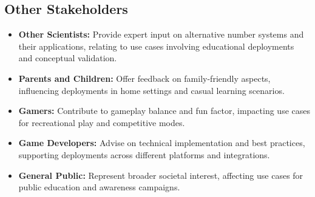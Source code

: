 \documentclass[12pt]{article}
\begin{document}
\subsection{Other Stakeholders}
\begin{itemize}
  \item \textbf{Other Scientists:} Provide expert input on alternative number systems and their applications, relating to use cases involving educational deployments and conceptual validation.
  \item \textbf{Parents and Children:} Offer feedback on family-friendly aspects, influencing deployments in home settings and casual learning scenarios.
  \item \textbf{Gamers:} Contribute to gameplay balance and fun factor, impacting use cases for recreational play and competitive modes.
  \item \textbf{Game Developers:} Advise on technical implementation and best practices, supporting deployments across different platforms and integrations.
  \item \textbf{General Public:} Represent broader societal interest, affecting use cases for public education and awareness campaigns.
\end{itemize}
\end{document}
